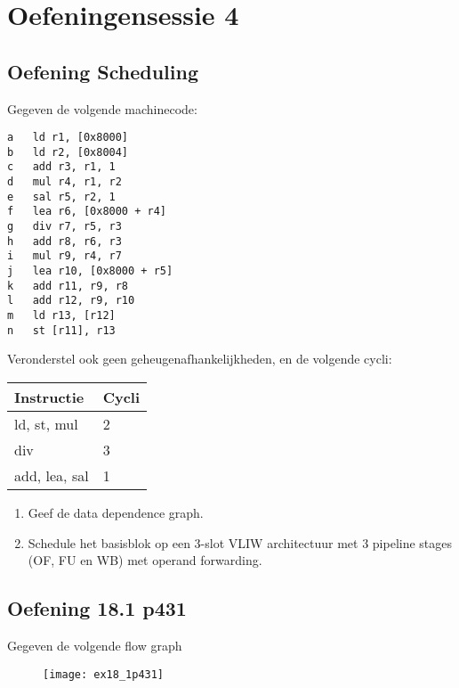 \chapter{Oefeningensessie 4}


\section{Oefening Scheduling}

Gegeven de volgende machinecode:
\begin{lstlisting}
a	ld r1, [0x8000]
b	ld r2, [0x8004]
c	add r3, r1, 1
d	mul r4, r1, r2
e	sal r5, r2, 1
f	lea r6, [0x8000 + r4]
g	div r7, r5, r3
h	add r8, r6, r3
i	mul	r9, r4, r7
j	lea r10, [0x8000 + r5]
k	add r11, r9, r8
l	add r12, r9, r10
m	ld r13, [r12]
n	st [r11], r13
\end{lstlisting}
Veronderstel ook geen geheugenafhankelijkheden, en de volgende cycli:
\begin{table}[ht]
	\centering
	\begin{tabular}{| l | l |}
		\hline 
		\textbf{Instructie} & \textbf{Cycli} \\
		\hline
		ld, st, mul & 2 \\
		div & 3 \\
		add, lea, sal & 1 \\
		\hline
	\end{tabular}
\end{table}

\begin{enumerate}
	\item Geef de data dependence graph.
	\item Schedule het basisblok op een 3-slot VLIW architectuur met 3 pipeline stages (OF, FU en WB) met operand forwarding.
	
\end{enumerate}

\section{Oefening 18.1 p431}
Gegeven de volgende flow graph

\begin{figure}[ht]
	\centering
	\texttt{[image: ex18\_1p431]}
	\caption{}
	\label{fig:ex18_1p431}
\end{figure}

